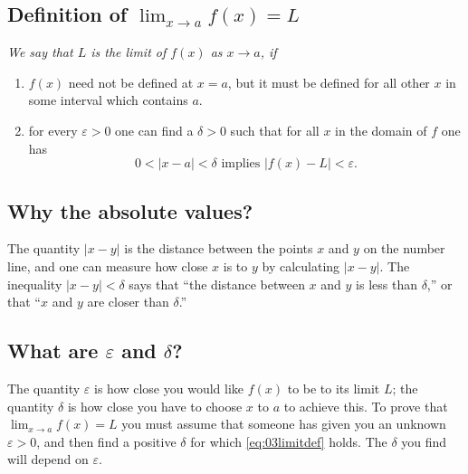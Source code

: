 \subsection{Definition of $\lim_{x\to a} f(x) = L$}
\itshape%
We say that $L$ is the limit of $f(x)$ as $x\to a$, if
\begin{enumerate}

\item $f(x)$ need not be defined at $x=a$, but it must be defined for all
  other $x$ in some interval which contains $a$.

\item for every $\varepsilon>0$ one can find a $\delta>0$ such that for all
  $x$ in the domain of $f$ one has
  \begin{equation}\label{eq:03limitdef}
    0 < |x-a| < \delta \text{ implies } |f(x) - L|<\varepsilon.
  \end{equation}
\end{enumerate}
\upshape

\subsection*{Why the absolute values? }
The quantity $|x-y|$ is the distance between the points $x$ and $y$ on
the number line, and one can measure how close $x$ is to $y$ by
calculating $|x-y|$.  The inequality $|x-y|<\delta$ says that ``the
distance between $x$ and $y$ is less than $\delta$,'' or that ``$x$
and $y$ are closer than $\delta$.''

\subsection*{What are $\varepsilon$ and $\delta$?}
The quantity $\varepsilon$ is how close you would like $f(x)$ to be to
its limit $L$; the quantity $\delta$ is how close you have to choose
$x$ to $a$ to achieve this.  To prove that $\lim_{x\to a} f(x) = L$
you must assume that someone has given you an unknown $\varepsilon>0$,
and then find a positive $\delta$ for which \eqref{eq:03limitdef}
holds.  The $\delta$ you find will depend on $\varepsilon$.


\begin{figure}
  

  

  
\end{figure}

